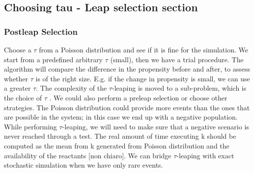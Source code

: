 \subsection{Choosing tau - Leap selection section}

\subsubsection{Postleap Selection}
Choose a $\tau$ from a Poisson distribution and see if it is fine for the simulation.
We start from a predefined arbitrary $\tau$ (small), then we have a trial procedure.
The algorithm will compare the difference in the propensity before and after, to assess whether $\tau$ is of the right size.
E.g. if the change in propensity is small, we can use a greater $\tau$.
The complexity of the $\tau$-leaping is moved to a sub-problem, which is the choice of $\tau$ .
We could also perform a preleap selection or choose other strategies.
The Poisson distribution could provide more events than the ones that are possible in the system; in this case we end up with a negative population.
While performing $\tau$-leaping, we will need to make sure that a negative scenario is never reached through a test.
The real amount of time executing k should be computed as the mean from k generated from Poisson distribution and the availability of the reactants {[}non chiaro{]}.
We can bridge $\tau$-leaping with exact stochastic simulation when we have only rare events.

